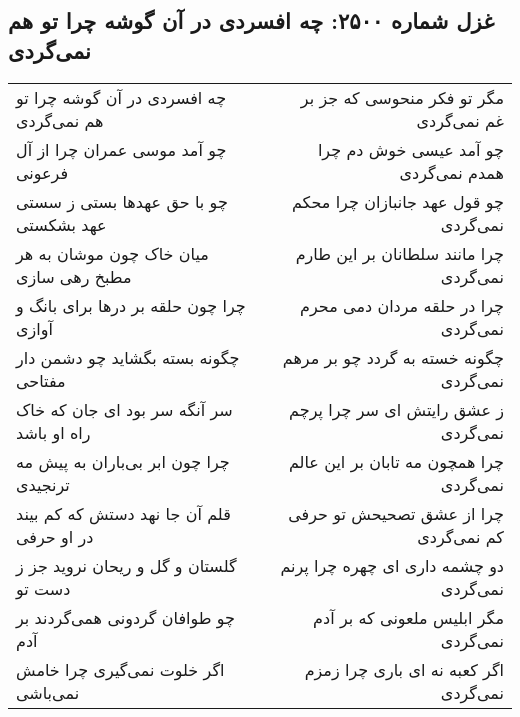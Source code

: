 \begin{center}
\section*{غزل شماره ۲۵۰۰: چه افسردی در آن گوشه چرا تو هم نمی‌گردی}
\label{sec:2500}
\begin{longtable}{l p{0.5cm} r}
چه افسردی در آن گوشه چرا تو هم نمی‌گردی
&&
مگر تو فکر منحوسی که جز بر غم نمی‌گردی
\\
چو آمد موسی عمران چرا از آل فرعونی
&&
چو آمد عیسی خوش دم چرا همدم نمی‌گردی
\\
چو با حق عهدها بستی ز سستی عهد بشکستی
&&
چو قول عهد جانبازان چرا محکم نمی‌گردی
\\
میان خاک چون موشان به هر مطبخ رهی سازی
&&
چرا مانند سلطانان بر این طارم نمی‌گردی
\\
چرا چون حلقه بر درها برای بانگ و آوازی
&&
چرا در حلقه مردان دمی محرم نمی‌گردی
\\
چگونه بسته بگشاید چو دشمن دار مفتاحی
&&
چگونه خسته به گردد چو بر مرهم نمی‌گردی
\\
سر آنگه سر بود ای جان که خاک راه او باشد
&&
ز عشق رایتش ای سر چرا پرچم نمی‌گردی
\\
چرا چون ابر بی‌باران به پیش مه ترنجیدی
&&
چرا همچون مه تابان بر این عالم نمی‌گردی
\\
قلم آن جا نهد دستش که کم بیند در او حرفی
&&
چرا از عشق تصحیحش تو حرفی کم نمی‌گردی
\\
گلستان و گل و ریحان نروید جز ز دست تو
&&
دو چشمه داری ای چهره چرا پرنم نمی‌گردی
\\
چو طوافان گردونی همی‌گردند بر آدم
&&
مگر ابلیس ملعونی که بر آدم نمی‌گردی
\\
اگر خلوت نمی‌گیری چرا خامش نمی‌باشی
&&
اگر کعبه نه ای باری چرا زمزم نمی‌گردی
\\
\end{longtable}
\end{center}
